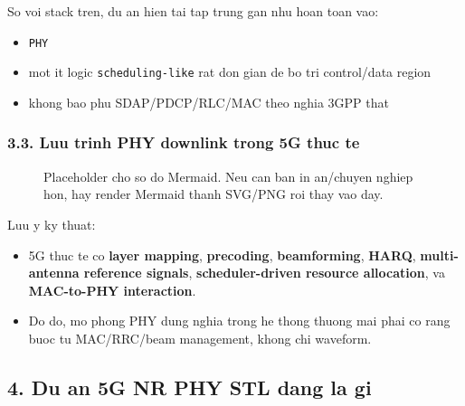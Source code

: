 \documentclass[
  vietnamese,
  a4paper,
  11pt]{article}
\providecommand{\tightlist}{%
  \setlength{\itemsep}{0pt}\setlength{\parskip}{0pt}}
\begin{document}
So voi stack tren, du an hien tai tap trung gan nhu hoan toan vao:

\begin{itemize}
\tightlist
\item
  \texttt{PHY}
\item
  mot it logic \texttt{scheduling-like} rat don gian de bo tri
  control/data region
\item
  khong bao phu SDAP/PDCP/RLC/MAC theo nghia 3GPP that
\end{itemize}

\subsubsection{3.3. Luu trinh PHY downlink trong 5G thuc
te}\label{luu-trinh-phy-downlink-trong-5g-thuc-te}

\begin{figure}[H]
\centering
{}
\caption{Placeholder cho so do Mermaid. Neu can ban in an/chuyen nghiep hon, hay render Mermaid thanh SVG/PNG roi thay vao day.}
\end{figure}

Luu y ky thuat:

\begin{itemize}
\tightlist
\item
  5G thuc te co \textbf{layer mapping}, \textbf{precoding},
  \textbf{beamforming}, \textbf{HARQ}, \textbf{multi-antenna reference
  signals}, \textbf{scheduler-driven resource allocation}, va
  \textbf{MAC-to-PHY interaction}.
\item
  Do do, mo phong PHY dung nghia trong he thong thuong mai phai co rang
  buoc tu MAC/RRC/beam management, khong chi waveform.
\end{itemize}

\subsection{4. Du an 5G NR PHY STL dang la
gi}\label{du-an-5g-nr-phy-stl-dang-la-gi}
\end{document}
